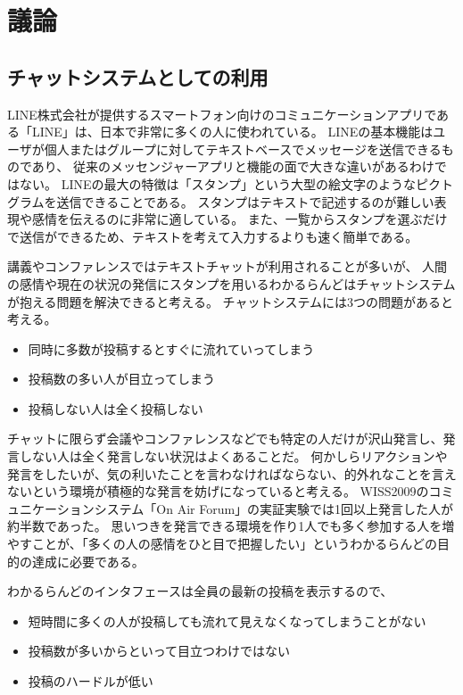\section{議論}

\subsection{チャットシステムとしての利用}

LINE株式会社が提供するスマートフォン向けのコミュニケーションアプリである「LINE」は、日本で非常に多くの人に使われている。
LINEの基本機能はユーザが個人またはグループに対してテキストベースでメッセージを送信できるものであり、
従来のメッセンジャーアプリと機能の面で大きな違いがあるわけではない。
LINEの最大の特徴は「スタンプ」という大型の絵文字のようなピクトグラムを送信できることである。
スタンプはテキストで記述するのが難しい表現や感情を伝えるのに非常に適している。
また、一覧からスタンプを選ぶだけで送信ができるため、テキストを考えて入力するよりも速く簡単である。

講義やコンファレンスではテキストチャットが利用されることが多いが、
人間の感情や現在の状況の発信にスタンプを用いるわかるらんどはチャットシステムが抱える問題を解決できると考える。
チャットシステムには3つの問題があると考える。

\begin{itemize}
\item 同時に多数が投稿するとすぐに流れていってしまう
\item 投稿数の多い人が目立ってしまう
\item 投稿しない人は全く投稿しない
\end{itemize}

チャットに限らず会議やコンファレンスなどでも特定の人だけが沢山発言し、発言しない人は全く発言しない状況はよくあることだ。
何かしらリアクションや発言をしたいが、気の利いたことを言わなければならない、的外れなことを言えないという環境が積極的な発言を妨げになっていると考える。
WISS2009のコミュニケーションシステム「On Air Forum」の実証実験では1回以上発言した人が約半数であった。
思いつきを発言できる環境を作り1人でも多く参加する人を増やすことが、「多くの人の感情をひと目で把握したい」というわかるらんどの目的の達成に必要である。

わかるらんどのインタフェースは全員の最新の投稿を表示するので、

\begin{itemize}
\item 短時間に多くの人が投稿しても流れて見えなくなってしまうことがない
\item 投稿数が多いからといって目立つわけではない
\item 投稿のハードルが低い
\end{itemize}

